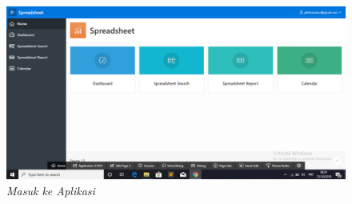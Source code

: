 \begin{enumerate}
\begin{figure}
    \begin{center}
\includegraphics[scale=0.4]{apex/apex9.png}
    \caption{\textit{Masuk ke Aplikasi}}
        \end{center}
\label{gambar}
\end{figure}

\end{enumerate}